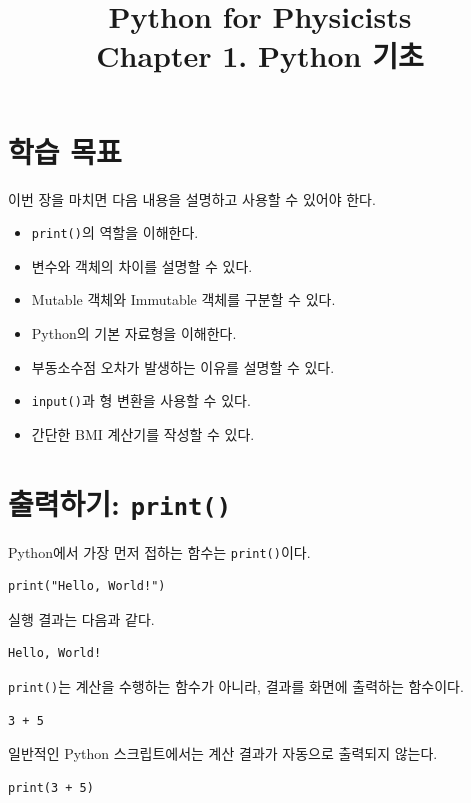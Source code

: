 \documentclass[11pt,a4paper]{article}
\title{\textbf{Python for Physicists}\\[0.4em]
\large Chapter 1. Python 기초}
\author{}
\date{}
\begin{document}
\maketitle
\tableofcontents
\newpage

\section{학습 목표}

이번 장을 마치면 다음 내용을 설명하고 사용할 수 있어야 한다.

\begin{itemize}[leftmargin=2em]
  \item \texttt{print()}의 역할을 이해한다.
  \item 변수와 객체의 차이를 설명할 수 있다.
  \item Mutable 객체와 Immutable 객체를 구분할 수 있다.
  \item Python의 기본 자료형을 이해한다.
  \item 부동소수점 오차가 발생하는 이유를 설명할 수 있다.
  \item \texttt{input()}과 형 변환을 사용할 수 있다.
  \item 간단한 BMI 계산기를 작성할 수 있다.
\end{itemize}

\section{출력하기: \texttt{print()}}

Python에서 가장 먼저 접하는 함수는 \texttt{print()}이다.

\begin{lstlisting}
print("Hello, World!")
\end{lstlisting}

실행 결과는 다음과 같다.

\begin{verbatim}
Hello, World!
\end{verbatim}

\texttt{print()}는 계산을 수행하는 함수가 아니라, 결과를 화면에 출력하는 함수이다.

\begin{lstlisting}
3 + 5
\end{lstlisting}

일반적인 Python 스크립트에서는 계산 결과가 자동으로 출력되지 않는다.

\begin{lstlisting}
print(3 + 5)
\end{lstlisting}
\end{document}
